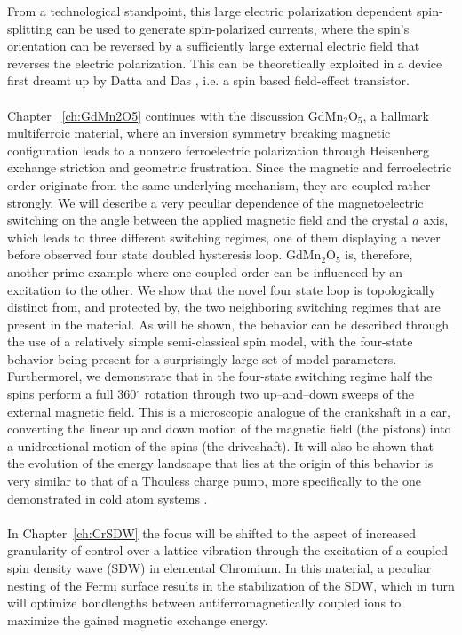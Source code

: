 From a technological standpoint, this large electric polarization dependent spin-splitting can be used to generate spin-polarized currents, where the spin's orientation can be reversed by a sufficiently large external electric field that reverses the electric polarization.
This can be theoretically exploited in a device first dreamt up by Datta and Das \cite{Datta1990}, i.e. a spin based field-effect transistor.
\\\\
Chapter ~\ref{ch:GdMn2O5} continues with the discussion GdMn$_2$O$_5$, a hallmark multiferroic material, where an inversion symmetry breaking magnetic configuration leads to a nonzero ferroelectric polarization through Heisenberg exchange striction and geometric frustration.
Since the magnetic and ferroelectric order originate from the same underlying mechanism, they are coupled rather strongly.
We will describe a very peculiar dependence of the magnetoelectric switching on the angle between the applied magnetic field and the crystal $a$ axis, which leads to three different switching regimes, one of them displaying a never before observed four state doubled hysteresis loop. 
GdMn$_2$O$_5$ is, therefore, another prime example where one coupled order can be influenced by an excitation to the other.
We show that the novel four state loop is topologically distinct from, and protected by, the two neighboring switching regimes that are present in the material.
As will be shown, the behavior can be described through the use of a relatively simple semi-classical spin model, with the four-state behavior being present for a surprisingly large set of model parameters.
Furthermorel, we demonstrate that in the four-state switching regime half the spins perform a full 360$^\circ$ rotation through two up--and--down sweeps of the external magnetic field.
This is a microscopic analogue of the crankshaft in a car, converting the linear up and down motion of the magnetic field (the pistons) into a unidrectional motion of the spins (the driveshaft).
It will also be shown that the evolution of the energy landscape that lies at the origin of this behavior is very similar to that of a Thouless charge pump, more specifically to the one demonstrated in cold atom systems \cite{Lohse16}. 
\\\\
In Chapter~\ref{ch:CrSDW} the focus will be shifted to the aspect of increased granularity of control over a lattice vibration through the excitation of a coupled spin density wave (SDW) in elemental Chromium.
In this material, a peculiar nesting of the Fermi surface results in the stabilization of the SDW, which in turn will optimize bondlengths between antiferromagnetically coupled ions to maximize the gained magnetic exchange energy.
